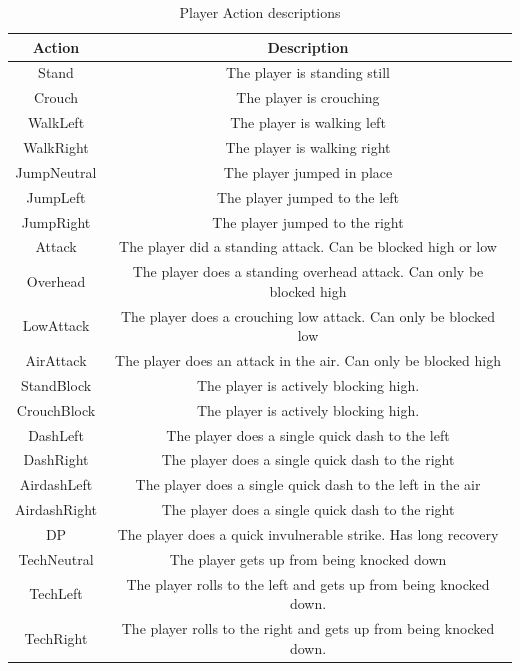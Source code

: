 \begin{table}[h]
	\centering
	\caption{Player Action descriptions}
	\begin{tabular}{| c | c |}
		\hline
		Action & Description \\
		\hline
		Stand & The player is standing still \\ 
		\hline
		Crouch & The player is crouching \\ 
		\hline
		WalkLeft & The player is walking left \\ 
		\hline
		WalkRight & The player is walking right \\
		\hline
		JumpNeutral & The player jumped in place \\
		\hline
		JumpLeft & The player jumped to the left\\
		\hline
		JumpRight & The player jumped to the right \\
		\hline
		Attack & The player did a standing attack. Can be blocked high or low \\
		\hline
		Overhead & The player does a standing overhead attack. Can only be blocked high \\ 
		\hline
		LowAttack & The player does a crouching low attack. Can only be blocked low \\ 
		\hline
		AirAttack & The player does an attack in the air. Can only be blocked high \\ 
		\hline
		StandBlock & The player is actively blocking high. \\ 
		\hline
		CrouchBlock & The player is actively blocking high. \\ 
		\hline
		DashLeft & The player does a single quick dash to the left \\ 
		\hline
		DashRight & The player does a single quick dash to the right \\ 
		\hline
		AirdashLeft & The player does a single quick dash to the left in the air \\ 
		\hline
		AirdashRight & The player does a single quick dash to the right \\ 
		\hline
		DP & The player does a quick invulnerable strike. Has long recovery \\
		\hline
		TechNeutral & The player gets up from being knocked down \\ 
		\hline
		TechLeft & The player rolls to the left and gets up from being knocked down. \\ 
		\hline
		TechRight & The player rolls to the right and gets up from being knocked down. \\ 
		\hline
	\end{tabular}
	\label{actions}
\end{table}